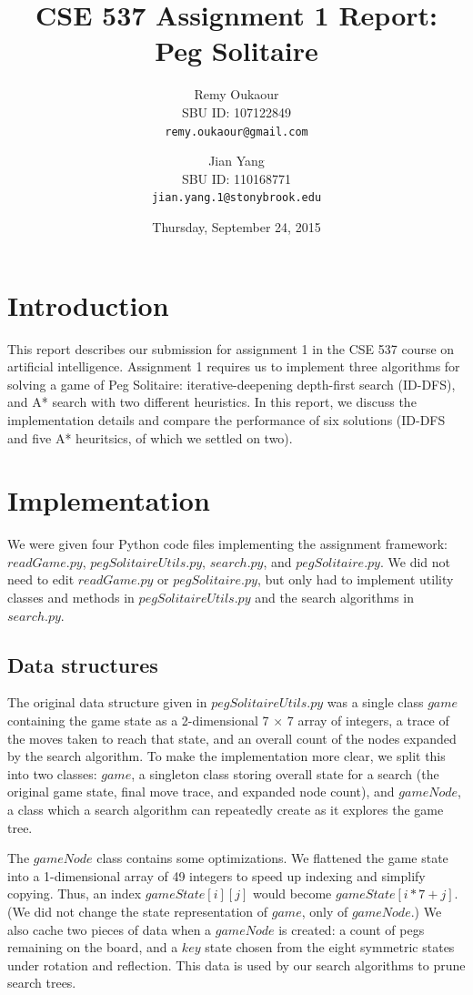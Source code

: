 \documentclass[11pt]{article}
\title{CSE 537 Assignment 1 Report: Peg Solitaire}
\author{
Remy Oukaour \\
	{\small SBU ID: 107122849}\\
	{\small \texttt{remy.oukaour@gmail.com}}
\and
Jian Yang \\
	{\small SBU ID: 110168771}\\
	{\small \texttt{jian.yang.1@stonybrook.edu}}
}
\date{Thursday, September 24, 2015}
\begin{document}
\maketitle

\section{Introduction}

This report describes our submission for assignment 1 in the CSE 537 course on
artificial intelligence. Assignment 1 requires us to implement three algorithms
for solving a game of Peg Solitaire: iterative-deepening depth-first search
(ID-DFS), and A* search with two different heuristics. In this report, we
discuss the implementation details and compare the performance of six solutions
(ID-DFS and five A* heuritsics, of which we settled on two).

\section{Implementation}

We were given four Python code files implementing the assignment framework:
\(readGame.py\), \(pegSolitaireUtils.py\), \(search.py\), and \(pegSolitaire.py\).
We did not need to edit \(readGame.py\) or \(pegSolitaire.py\), but only had to
implement utility classes and methods in \(pegSolitaireUtils.py\) and the search
algorithms in \(search.py\).

\subsection{Data structures}

The original data structure given in \(pegSolitaireUtils.py\) was a single
class \(game\) containing the game state as a 2-dimensional 7 $\times$ 7 array of
integers, a trace of the moves taken to reach that state, and an overall count
of the nodes expanded by the search algorithm. To make the implementation more
clear, we split this into two classes: \(game\), a singleton class storing
overall state for a search (the original game state, final move trace, and
expanded node count), and \(gameNode\), a class which a search algorithm can
repeatedly create as it explores the game tree.

The \(gameNode\) class contains some optimizations. We flattened the game state
into a 1-dimensional array of 49 integers to speed up indexing and simplify
copying. Thus, an index \(gameState[i][j]\) would become \(gameState[i*7+j]\).
(We did not change the state representation of \(game\), only of \(gameNode\).)
We also cache two pieces of data when a \(gameNode\) is created: a count of
pegs remaining on the board, and a \(key\) state chosen from the eight symmetric
states under rotation and reflection. This data is used by our search algorithms
to prune search trees.
\end{document}
